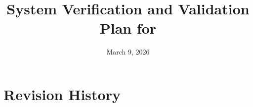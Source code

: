 \documentclass[12pt, titlepage]{article}
\newcommand{\tidanchor}[1]{\hypertarget{tid:#1}{}}
\newcommand{\tidallanchors}{%
  \tidanchor{test-acquire-frame}%
  \tidanchor{test-api-client-automatic-discovery}%
  \tidanchor{test-api-client-methods}%
  \tidanchor{test-api-client-urls}%
  \tidanchor{test-api-endpoints-exist}%
  \tidanchor{test-api-error-responses}%
  \tidanchor{test-api-recordings-crud}%
  \tidanchor{test-api-validation}%
  \tidanchor{test-app-routing}%
  \tidanchor{test-bilingual-ui}%
  \tidanchor{test-bounding-box-center}%
  \tidanchor{test-bounding-box-collection}%
  \tidanchor{test-bounding-box-rotate-90}%
  \tidanchor{test-color-vision-deficiency}%
  \tidanchor{test-configuration-menu}%
  \tidanchor{test-confirmation-prompts}%
  \tidanchor{test-consistent-units}%
  \tidanchor{test-control-page-bbox-overlay}%
  \tidanchor{test-control-page-drag}%
  \tidanchor{test-control-page-render}%
  \tidanchor{test-control-process-main-entry}%
  \tidanchor{test-controls-card}%
  \tidanchor{test-controls-card-render}%
  \tidanchor{test-cv-format-time}%
  \tidanchor{test-cv-management-exception-safety}%
  \tidanchor{test-cv-management-osd-send}%
  \tidanchor{test-cv-management-pause-resume}%
  \tidanchor{test-cv-management-recording-commands}%
  \tidanchor{test-cv-management-recv-loop}%
  \tidanchor{test-cv-update-osd}%
  \tidanchor{test-database-allocate}%
  \tidanchor{test-database-error-handling}%
  \tidanchor{test-database-list-recordings}%
  \tidanchor{test-database-path-traversal-protection}%
  \tidanchor{test-database-rename-delete}%
  \tidanchor{test-database-space-usage}%
  \tidanchor{test-dataclass-construction}%
  \tidanchor{test-disconnect-camera}%
  \tidanchor{test-disconnect-hdmi}%
  \tidanchor{test-disk-full}%
  \tidanchor{test-exit-gimbal-range}%
  \tidanchor{test-formatters-bytes}%
  \tidanchor{test-formatters-degrees}%
  \tidanchor{test-formatters-duration}%
  \tidanchor{test-formatters-edge-cases}%
  \tidanchor{test-formatters-internationalization}%
  \tidanchor{test-formatters-temperature}%
  \tidanchor{test-gimbal-angle-commands}%
  \tidanchor{test-gimbal-crc8}%
  \tidanchor{test-gimbal-info-query}%
  \tidanchor{test-gimbal-interface}%
  \tidanchor{test-gimbal-led-control}%
  \tidanchor{test-gimbal-packet-construction}%
  \tidanchor{test-hdmi-output}%
  \tidanchor{test-i18n-activation}%
  \tidanchor{test-immediate-ui-feedback}%
  \tidanchor{test-ip4-addresses}%
  \tidanchor{test-ipc-buffer-memory-safety}%
  \tidanchor{test-ipc-buffer-overrun-handling}%
  \tidanchor{test-ipc-buffer-receiver}%
  \tidanchor{test-ipc-buffer-sender}%
  \tidanchor{test-language-selector}%
  \tidanchor{test-livestream-construction}%
  \tidanchor{test-livestream-process-loop}%
  \tidanchor{test-log-operations}%
  \tidanchor{test-main-dispatch-control}%
  \tidanchor{test-main-dispatch-cv}%
  \tidanchor{test-main-dispatch-livestream}%
  \tidanchor{test-main-dispatch-transcode}%
  \tidanchor{test-main-dispatch-unknown}%
  \tidanchor{test-manage-recordings}%
  \tidanchor{test-manual-arm-mode}%
  \tidanchor{test-manual-control}%
  \tidanchor{test-manual-idle-mode}%
  \tidanchor{test-navbar}%
  \tidanchor{test-network-disconnect}%
  \tidanchor{test-no-collection-pii}%
  \tidanchor{test-preview-real-time}%
  \tidanchor{test-recording}%
  \tidanchor{test-recordings-delete}%
  \tidanchor{test-recordings-page-empty}%
  \tidanchor{test-recordings-page-list}%
  \tidanchor{test-recordings-page-loading}%
  \tidanchor{test-recordings-rename}%
  \tidanchor{test-report-errors}%
  \tidanchor{test-return-to-idle}%
  \tidanchor{test-rocam-provider-error-handling}%
  \tidanchor{test-rocam-provider-initialization}%
  \tidanchor{test-rocam-provider-polling}%
  \tidanchor{test-scheduler-validation}%
  \tidanchor{test-sse-broadcast-performance}%
  \tidanchor{test-sse-thread-safety}%
  \tidanchor{test-state-error-handling}%
  \tidanchor{test-state-management-arm-disarm}%
  \tidanchor{test-state-management-download-pause}%
  \tidanchor{test-state-management-manual-move}%
  \tidanchor{test-state-management-manual-move-clamped}%
  \tidanchor{test-state-management-recording}%
  \tidanchor{test-state-management-recording-only-noops}%
  \tidanchor{test-state-management-recording-only-status}%
  \tidanchor{test-state-status-performance}%
  \tidanchor{test-stop-immediately}%
  \tidanchor{test-system-status-caching}%
  \tidanchor{test-system-status-callback-updates}%
  \tidanchor{test-system-status-card}%
  \tidanchor{test-tracking}%
  \tidanchor{test-tracking-angle-clamping}%
  \tidanchor{test-tracking-queue-behavior}%
  \tidanchor{test-tracking-stop}%
  \tidanchor{test-tracking-worker-control-law}%
  \tidanchor{test-transcode-bus-call}%
  \tidanchor{test-transcode-pipe-cleanup}%
  \tidanchor{test-transcode-read-log}%
  \tidanchor{test-transcode-routes-404}%
  \tidanchor{test-transcode-shader-probe}%
  \tidanchor{test-transcode-streaming}%
  \tidanchor{test-transition-to-tracking}%
  \tidanchor{test-ui-error-handling}%
  \tidanchor{test-ui-loading-states}%
  \tidanchor{test-use-rocam-hook}%
  \tidanchor{test-user-survey}%
  \tidanchor{test-validate-commands}%
  \tidanchor{test-visual-indicators}%
  \tidanchor{test-watchdog-clear}%
  \tidanchor{test-watchdog-refresh}%
  \tidanchor{test-watchdog-timeout-accuracy}%
}
\begin{document}
\tidallanchors

\newcommand{\SRS}{\href{../SRS/SRS.pdf}{SRS}}
\newcommand{\MG}{\href{../Design/SoftArchitecture/MG.pdf}{MG}}
\newcommand{\MIS}{\href{../Design/SoftDetailedDes/MIS.pdf}{MIS}}

\title{System Verification and Validation Plan for \progname{}}
\author{\authname}
\date{March 9, 2026}

\maketitle


\section*{Revision History}
\end{document}
